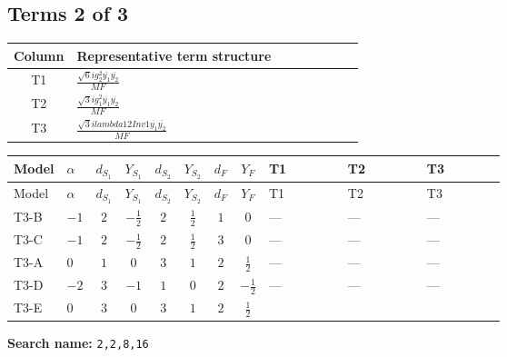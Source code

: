 \documentclass[8pt]{article}
\begin{document}
\begin{landscape}
\subsection*{Terms 2 of 3}
\begin{center}
\begin{tabular}{@{}c >{\raggedright\arraybackslash}p{0.82\linewidth}@{}}
\toprule
Column & Representative term structure \\
\midrule
T1 & \(\displaystyle \frac{\sqrt{6} i g_{2}^{2} \overline{y_{1}} \overline{y_{2}}}{MF}\) \\
\midrule
T2 & \(\displaystyle \frac{\sqrt{3} i g_{1}^{2} \overline{y_{1}} \overline{y_{2}}}{MF}\) \\
\midrule
T3 & \(\displaystyle \frac{\sqrt{3} i lambda12Inv1 \overline{y_{1}} \overline{y_{2}}}{MF}\) \\
\midrule
\bottomrule
\end{tabular}
\end{center}
\smallskip
\tiny
\begin{longtable}{@{}llcccccc >{\raggedright\arraybackslash}p{0.21\linewidth} >{\raggedright\arraybackslash}p{0.21\linewidth} >{\raggedright\arraybackslash}p{0.21\linewidth}@{}}
\toprule
Model & $\alpha$ & $d_{S_1}$ & $Y_{S_1}$ & $d_{S_2}$ & $Y_{S_2}$ & $d_F$ & $Y_F$ & T1 & T2 & T3 \\
\midrule
\endfirsthead
\toprule
Model & $\alpha$ & $d_{S_1}$ & $Y_{S_1}$ & $d_{S_2}$ & $Y_{S_2}$ & $d_F$ & $Y_F$ & T1 & T2 & T3 \\
\midrule
\endhead
T3-B & $-1$ & $2$ & $-\frac{1}{2}$ & $2$ & $\frac{1}{2}$ & $1$ & $0$ & --- & --- & --- \\
\midrule
T3-C & $-1$ & $2$ & $-\frac{1}{2}$ & $2$ & $\frac{1}{2}$ & $3$ & $0$ & --- & --- & --- \\
\midrule
T3-A & $0$ & $1$ & $0$ & $3$ & $1$ & $2$ & $\frac{1}{2}$ & --- & --- & --- \\
\midrule
T3-D & $-2$ & $3$ & $-1$ & $1$ & $0$ & $2$ & $-\frac{1}{2}$ & --- & --- & --- \\
\midrule
T3-E & $0$ & $3$ & $0$ & $3$ & $1$ & $2$ & $\frac{1}{2}$ & \scriptsize\adjustbox{max width=\linewidth}{$\begin{gathered} - \frac{\sqrt{6} i g_{2}^{2} \overline{y_{1}} \overline{y_{2}}}{3 MF}\end{gathered}$} & \scriptsize\adjustbox{max width=\linewidth}{$\begin{gathered} - \frac{\sqrt{3} i g_{1}^{2} \overline{y_{1}} \overline{y_{2}}}{8 MF}\end{gathered}$} & \scriptsize\adjustbox{max width=\linewidth}{$\begin{gathered} \frac{\sqrt{3} i lambda12Inv1 \overline{y_{1}} \overline{y_{2}}}{6 MF}\end{gathered}$} \\
\midrule
\bottomrule
\end{longtable}
\clearpage
\noindent\textbf{Search name: }\texttt{2,2,8,16}\par\smallskip

\end{landscape}
\end{document}
